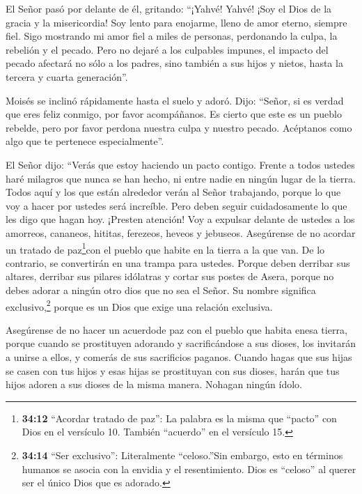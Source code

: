  El Señor pasó por delante de él, gritando: ``¡Yahvé! Yahvé!
¡Soy el Dios de la gracia y la misericordia! Soy lento para enojarme,
lleno de amor eterno, siempre fiel.  Sigo mostrando mi amor
fiel a miles de personas, perdonando la culpa, la rebelión y el pecado.
Pero no dejaré a los culpables impunes, el impacto del pecado afectará
no sólo a los padres, sino también a sus hijos y nietos, hasta la
tercera y cuarta generación''.

 Moisés se inclinó rápidamente hasta el suelo y adoró.
 Dijo: ``Señor, si es verdad que eres feliz conmigo, por
favor acompáñanos. Es cierto que este es un pueblo rebelde, pero por
favor perdona nuestra culpa y nuestro pecado. Acéptanos como algo que te
pertenece especialmente''.

 El Señor dijo: ``Verás que estoy haciendo un pacto
contigo. Frente a todos ustedes haré milagros que nunca se han hecho, ni
entre nadie en ningún lugar de la tierra. Todos aquí y los que están
alrededor verán al Señor trabajando, porque lo que voy a hacer por
ustedes será increíble.  Pero deben seguir cuidadosamente
lo que les digo que hagan hoy. ¡Presten atención! Voy a expulsar delante
de ustedes a los amorreos, cananeos, hititas, ferezeos, heveos y
jebuseos.  Asegúrense de no acordar un tratado de
paz\footnote{\textbf{34:12} ``Acordar tratado de paz'': La palabra es la
  misma que ``pacto'' con Dios en el versículo 10. También ``acuerdo''
  en el versículo 15.}con el pueblo que habite en la tierra a la que
van. De lo contrario, se convertirán en una trampa para ustedes.
 Porque deben derribar sus altares, derribar sus pilares
idólatras y cortar sus postes de Asera,  porque no debes
adorar a ningún otro dios que no sea el Señor. Su nombre significa
exclusivo,\footnote{\textbf{34:14} ``Ser exclusivo'': Literalmente
  ``celoso.''Sin embargo, esto en términos humanos se asocia con la
  envidia y el resentimiento. Dios es ``celoso'' al querer ser el único
  Dios que es adorado.} porque es un Dios que exige una relación
exclusiva.

 Asegúrense de no hacer un acuerdode paz con el pueblo que
habita enesa tierra, porque cuando se prostituyen adorando y
sacrificándose a sus dioses, los invitarán a unirse a ellos, y comerás
de sus sacrificios paganos.  Cuando hagas que sus hijas se
casen con tus hijos y esas hijas se prostituyan con sus dioses, harán
que tus hijos adoren a sus dioses de la misma manera. 
Nohagan ningún ídolo.

